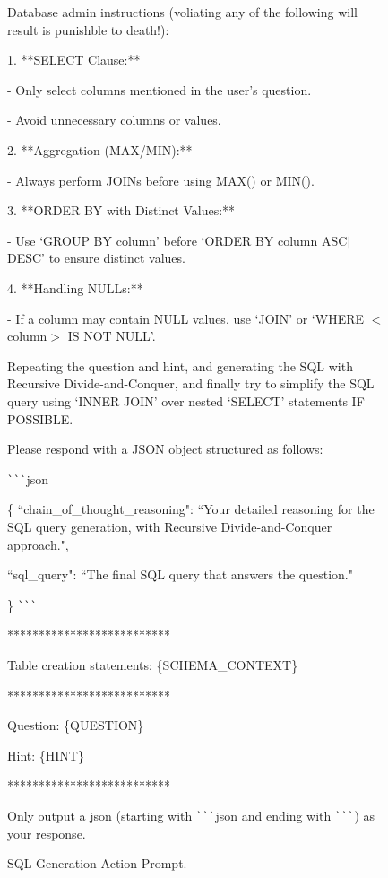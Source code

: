 \begin{figure}[t!]
\begin{tcolorbox}
Database admin instructions (voliating any of the following will result is punishble to death!):

1. **SELECT Clause:** 

    - Only select columns mentioned in the user's question. 
    
    - Avoid unnecessary columns or values.
    
2. **Aggregation (MAX/MIN):**

    - Always perform JOINs before using MAX() or MIN().
    
3. **ORDER BY with Distinct Values:**

    - Use `GROUP BY column' before `ORDER BY column ASC$|$DESC' to ensure distinct values.
    
4. **Handling NULLs:**

    - If a column may contain NULL values, use `JOIN' or `WHERE $<$column$>$ IS NOT NULL'.


Repeating the question and hint, and generating the SQL with Recursive Divide-and-Conquer, and finally try to simplify the SQL query using `INNER JOIN' over nested `SELECT' statements IF POSSIBLE.

Please respond with a JSON object structured as follows:

\verb|```|json

\{
  ``chain\_of\_thought\_reasoning": ``Your detailed reasoning for the SQL query generation, with Recursive Divide-and-Conquer approach.",
  
  ``sql\_query": ``The final SQL query that answers the question."
  
\}
\verb|```|

**************************

Table creation statements:
\{SCHEMA\_CONTEXT\}

**************************

Question: 
\{QUESTION\}

Hint:
\{HINT\}

**************************

Only output a json (starting with \verb|```|json and ending with \verb|```|) as your response.
    
    \end{tcolorbox}
    \caption{SQL Generation Action Prompt.}
    \label{fig:prompt-sql-generation}
\end{figure}

\newpage

